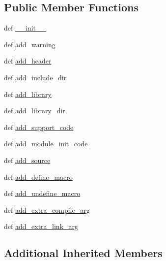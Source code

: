 \subsection*{Public Member Functions}
\begin{DoxyCompactItemize}
\item 
def \hyperlink{classscipy_1_1weave_1_1base__info_1_1custom__info_a374a427dc8f51c4dc9ef7414acc9ea2a}{\+\_\+\+\_\+init\+\_\+\+\_\+}
\item 
def \hyperlink{classscipy_1_1weave_1_1base__info_1_1custom__info_a17765487d5440bd5e7512d4e138e8da8}{add\+\_\+warning}
\item 
def \hyperlink{classscipy_1_1weave_1_1base__info_1_1custom__info_ac4f387d25411f208ed38fa7ac770f59b}{add\+\_\+header}
\item 
def \hyperlink{classscipy_1_1weave_1_1base__info_1_1custom__info_a986915d185bbac2719666a27551ade68}{add\+\_\+include\+\_\+dir}
\item 
def \hyperlink{classscipy_1_1weave_1_1base__info_1_1custom__info_a52bad71b1efdd1a4844e9ec29ac350c5}{add\+\_\+library}
\item 
def \hyperlink{classscipy_1_1weave_1_1base__info_1_1custom__info_a41e896cafa91b356aad294e1708637af}{add\+\_\+library\+\_\+dir}
\item 
def \hyperlink{classscipy_1_1weave_1_1base__info_1_1custom__info_a4a706ec299f1cd9460b8c46ebf2e9f5c}{add\+\_\+support\+\_\+code}
\item 
def \hyperlink{classscipy_1_1weave_1_1base__info_1_1custom__info_aa31bce72eb1ade8f9c65b212ed39ffc0}{add\+\_\+module\+\_\+init\+\_\+code}
\item 
def \hyperlink{classscipy_1_1weave_1_1base__info_1_1custom__info_acc4119c95c9c2bfc5c900e969cd18758}{add\+\_\+source}
\item 
def \hyperlink{classscipy_1_1weave_1_1base__info_1_1custom__info_ae306157b953dc1a17b7d7e2fab62a9d5}{add\+\_\+define\+\_\+macro}
\item 
def \hyperlink{classscipy_1_1weave_1_1base__info_1_1custom__info_a0a1559b6af3008049e8a94908d75b7eb}{add\+\_\+undefine\+\_\+macro}
\item 
def \hyperlink{classscipy_1_1weave_1_1base__info_1_1custom__info_a13dc84afaf73ba5003f8d0baddc195bc}{add\+\_\+extra\+\_\+compile\+\_\+arg}
\item 
def \hyperlink{classscipy_1_1weave_1_1base__info_1_1custom__info_a3cb0c7c6eaec819af0bcdbd4799cf1d8}{add\+\_\+extra\+\_\+link\+\_\+arg}
\end{DoxyCompactItemize}
\subsection*{Additional Inherited Members}


